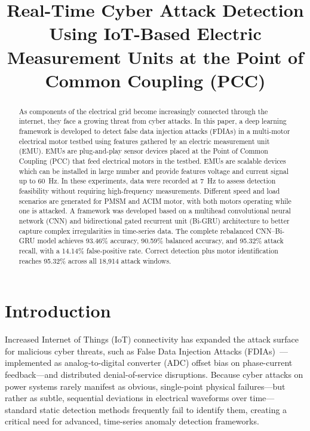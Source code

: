 \documentclass[conference,letterpaper]{IEEEtran}
\begin{document}
\title{Real-Time Cyber Attack Detection Using IoT-Based Electric Measurement Units at the Point of Common Coupling (PCC)}
\author{
}
\maketitle
\raggedbottom


\begin{abstract}
As components of the electrical grid become increasingly connected through the internet, they face a growing threat from cyber attacks. In this paper, a deep learning framework is developed to detect false data injection attacks (FDIAs) in a multi-motor electrical motor testbed using features gathered by an electric measurement unit (EMU). EMUs are plug-and-play sensor devices placed at the Point of Common Coupling (PCC) that feed electrical motors in the testbed. EMUs are scalable devices which can be installed in large number and provide features voltage and current signal up to 60~Hz. In these experiments, data were recorded at 7~Hz to assess detection feasibility without requiring high-frequency measurements. Different speed and load scenarios are generated for PMSM and ACIM motor, with both motors operating while one is attacked.
A framework was developed based on a multihead convolutional neural network (CNN) and bidirectional gated recurrent unit (Bi-GRU) architecture to better capture complex irregularities in time-series data. The complete rebalanced CNN--Bi-GRU model achieves 93.46\% accuracy, 90.59\% balanced accuracy, and 95.32\% attack recall, with a 14.14\% false-positive rate. Correct detection plus motor identification reaches 95.32\% across all 18,914 attack windows.
\end{abstract}

\section{Introduction}
Increased Internet of Things (IoT) connectivity has expanded the attack surface for malicious cyber threats, such as False Data Injection Attacks (FDIAs)~\cite{liu2009}---implemented as analog-to-digital converter (ADC) offset bias on phase-current feedback---and distributed denial-of-service disruptions. Because cyber attacks on power systems rarely manifest as obvious, single-point physical failures---but rather as subtle, sequential deviations in electrical waveforms over time---standard static detection methods frequently fail to identify them, creating a critical need for advanced, time-series anomaly detection frameworks.
\end{document}
